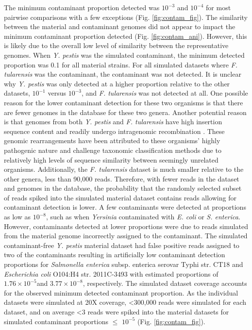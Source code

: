 \documentclass[fleqn,10pt,lineno]{wlpeerj}\usepackage[]{graphicx}\usepackage[]{color}
\begin{document}
The minimum contaminant proportion detected was $10^{-3}$ and  $10^{-4}$ for most pairwise comparisons with a few exceptions (Fig. \ref{fig:contam_fig}). 
The similarity between the material and contaminant genomes did not appear to impact the minimum contaminant proportion detected (Fig. \ref{fig:contam_ani}). 
However, this is likely due to the overall low level of similarity between the representative genomes. 
When \textit{Y. pestis} was the simulated contaminant, the minimum detected proportion was 0.1 for all material strains.
For all simulated datasets where \textit{F. tularensis} was the contaminant, the contaminant was not detected. 
It is unclear why \textit{Y. pestis} was only detected at a higher proportion relative to the other datasets, $10^{-1}$ versus $10^{-3}$, and \textit{F. tularensis} was not detected at all.
One possible reason for the lower contaminant detection for these two organisms is that there are fewer genomes in the database for these two genera. 
Another potential reason is that genomes from both \textit{Y. pestis} and \textit{F. tularensis} have high insertion sequence content and readily undergo intragenomic recombination \citep{larsson2005complete,chain2004insights}. 
These genomic rearrangements have been attributed to these organisms' highly pathogenic nature and challenge taxonomic classification methods due to relatively high levels of sequence similarity between seemingly unrelated organisms. 
Additionally, the \textit{F. tularensis} dataset is much smaller relative to the other genera, less than 90,000 reads. 
Therefore, with fewer reads in the dataset and genomes in the database, the probability that the randomly selected subset of reads spiked into the simulated material dataset contains reads allowing for contaminant detection is lower. 
A few contaminants were detected at proportions as low as $10^{-8}$, such as when \textit{Yersinia} contaminated with \textit{E. coli} or \textit{S. enterica}.
However, contaminants detected at lower proportions were due to reads simulated from the material genome incorrectly assigned to the contaminant.
The simulated contaminant-free \textit{Y. pestis} material dataset had false positive reads assigned to two of the contaminants resulting in artificially low contaminant detection proportions for \textit{Salmonella enterica} subsp. {enterica} serovar Typhi str. CT18 and \textit{Escherichia coli} O104:H4 str. 2011C-3493 with estimated proportions of \ensuremath{1.76\times 10^{-5}}and \ensuremath{3.77\times 10^{-8}}, respectively. 
The simulated dataset coverage accounts for the observed minimum detected contaminant proportion.
As the individual datasets were simulated at 20X coverage, \textless 300,000 reads were simulated for each dataset, and on average \textless 3 reads were spiked into the material datasets for simulated contaminant proportions $\leq$ $10^{-5}$ (Fig. \ref{fig:contam_fig}).
\end{document}
